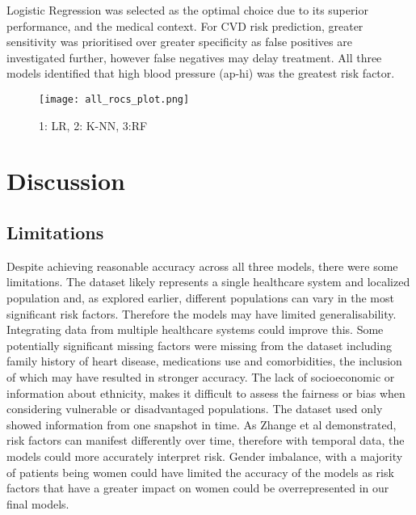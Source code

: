 \documentclass[conference]{IEEEtran}
\begin{document}
Logistic Regression was selected as the optimal choice due to its superior performance, and the medical context. For CVD risk prediction, greater sensitivity was prioritised over greater specificity as false positives are investigated further, however false negatives may delay treatment. All three models identified that high blood pressure (ap-hi) was the greatest risk factor.



\begin{figure}[htbp]
\centerline{\texttt{[image: all\_rocs\_plot.png]}}
\caption{1: LR, 2: K-NN, 3:RF}
\label{fig}
\end{figure}

\section{Discussion}
\subsection{Limitations} %
Despite achieving reasonable accuracy across all three models, there were some limitations.
The dataset likely represents a single healthcare system and localized population and, as explored earlier, different populations can vary in the most significant risk factors. Therefore the models may have limited generalisability. Integrating data from multiple healthcare systems could improve this.
Some potentially significant missing factors were missing from the dataset including family history of heart disease, medications use and comorbidities, the inclusion of which may have resulted in stronger accuracy.
The lack of socioeconomic or information about ethnicity, makes it difficult to assess the fairness or bias when considering vulnerable or disadvantaged populations.
The dataset used only showed information from one snapshot in time. As Zhange et al \cite{RW1} demonstrated, risk factors can manifest differently over time, therefore with temporal data, the models could more accurately interpret risk.
Gender imbalance, with a majority of patients being women could have limited the accuracy of the models as risk factors that have a greater impact on women could be overrepresented in our final models.
\end{document}

